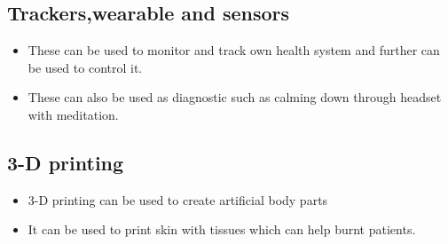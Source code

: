 \documentclass[12pt]{article}
\begin{document}
\subsection{Trackers,wearable and sensors}

\begin{itemize}

\item These can be used to monitor and track own health system and further can be used to control it.
\item These can also be used as diagnostic such as calming down through headset with meditation.
\end{itemize}

\subsection{3-D printing}

\begin{itemize}

\item 3-D printing can be used to create artificial body parts
\item It can be used to print skin with tissues which can help burnt patients.





\end{itemize}
\end{document}
